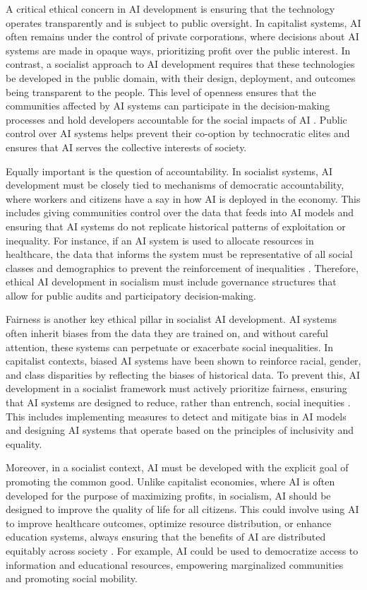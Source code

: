 \begin{refsection}
A critical ethical concern in AI development is ensuring that the technology operates transparently and is subject to public oversight. In capitalist systems, AI often remains under the control of private corporations, where decisions about AI systems are made in opaque ways, prioritizing profit over the public interest. In contrast, a socialist approach to AI development requires that these technologies be developed in the public domain, with their design, deployment, and outcomes being transparent to the people. This level of openness ensures that the communities affected by AI systems can participate in the decision-making processes and hold developers accountable for the social impacts of AI \cite[pp.~33-36]{mazzucato2023}. Public control over AI systems helps prevent their co-option by technocratic elites and ensures that AI serves the collective interests of society.

Equally important is the question of accountability. In socialist systems, AI development must be closely tied to mechanisms of democratic accountability, where workers and citizens have a say in how AI is deployed in the economy. This includes giving communities control over the data that feeds into AI models and ensuring that AI systems do not replicate historical patterns of exploitation or inequality. For instance, if an AI system is used to allocate resources in healthcare, the data that informs the system must be representative of all social classes and demographics to prevent the reinforcement of inequalities \cite[pp.~89-92]{treccani2021}. Therefore, ethical AI development in socialism must include governance structures that allow for public audits and participatory decision-making.

Fairness is another key ethical pillar in socialist AI development. AI systems often inherit biases from the data they are trained on, and without careful attention, these systems can perpetuate or exacerbate social inequalities. In capitalist contexts, biased AI systems have been shown to reinforce racial, gender, and class disparities by reflecting the biases of historical data. To prevent this, AI development in a socialist framework must actively prioritize fairness, ensuring that AI systems are designed to reduce, rather than entrench, social inequities \cite[pp.~112-115]{tapscott2016}. This includes implementing measures to detect and mitigate bias in AI models and designing AI systems that operate based on the principles of inclusivity and equality.

Moreover, in a socialist context, AI must be developed with the explicit goal of promoting the common good. Unlike capitalist economies, where AI is often developed for the purpose of maximizing profits, in socialism, AI should be designed to improve the quality of life for all citizens. This could involve using AI to improve healthcare outcomes, optimize resource distribution, or enhance education systems, always ensuring that the benefits of AI are distributed equitably across society \cite[pp.~67-70]{scholz2013}. For example, AI could be used to democratize access to information and educational resources, empowering marginalized communities and promoting social mobility.


\end{refsection}
